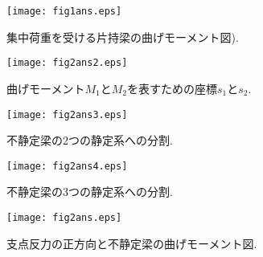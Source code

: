 \documentclass[10pt,a4j]{jarticle}
\begin{document}
\begin{figure}[h]
	\begin{center}
	\texttt{[image: fig1ans.eps]} 
	\end{center}
	\caption{集中荷重を受ける片持梁の曲げモーメント図).}
	\label{fig:fig1}
\end{figure}
\begin{figure}[h]
	\begin{center}
	\texttt{[image: fig2ans2.eps]} 
	\end{center}
	\caption{曲げモーメント$M_1$と$M_2$を表すための座標$s_1$と$s_2$.}
	\label{fig:fig2}
\end{figure}
\begin{figure}[h]
	\begin{center}
	\texttt{[image: fig2ans3.eps]} 
	\end{center}
	\caption{不静定梁の2つの静定系への分割.}
	\label{fig:fig2_2}
\end{figure}
\begin{figure}[h]
	\begin{center}
	\texttt{[image: fig2ans4.eps]} 
	\end{center}
	\caption{不静定梁の3つの静定系への分割.}
	\label{fig:fig2_3}
\end{figure}
\begin{figure}
	\begin{center}
	\texttt{[image: fig2ans.eps]} 
	\end{center}
	\caption{支点反力の正方向と不静定梁の曲げモーメント図.}
	\label{fig:fig3}
\end{figure}
\newpage
\end{document}
